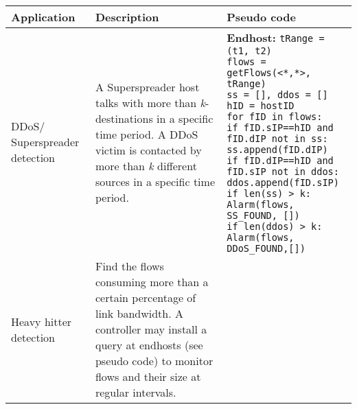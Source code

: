 \newpage
\begin{table}[!h]
{\small
{}
\begin{tabular}{C{2cm} L{5cm} L{10cm}}
\toprule
  \textbf{Application}  &  \textbf{Description}  &  \textbf{Pseudo code} \\
\midrule \midrule

DDoS/\newline
Superspreader
detection				& A Superspreader host talks with more than  \textit{k}-destinations in a 								  specific time period. A DDoS victim is contacted by more 								than \textit{k} different sources in a specific time period. 
						&  \textbf{Endhost:} \newline
							\texttt{tRange = (t1, t2) \newline
							flows = getFlows(<*,*>, tRange) \newline
							ss = [], ddos = [] hID = hostID \newline
							for fID in flows: \newline
							\hspace{0.2cm}	if fID.sIP==hID and fID.dIP not in ss: \newline
							\hspace{0.3cm} \hspace{0.3cm}		ss.append(fID.dIP) \newline
							\hspace{0.2cm}	if fID.dIP==hID and fID.sIP not in ddos: \newline
							 \hspace{0.3cm}\hspace{0.3cm}		ddos.append(fID.sIP) \newline
							if len(ss) > k: \newline
								\hspace{0.3cm} Alarm(flows, SS\_FOUND, []) \newline
							if len(ddos) > k: \newline
								\hspace{0.3cm} Alarm(flows, DDoS\_FOUND,[]) } \\
\midrule

Heavy hitter detection &  Find the flows consuming more than a certain percentage of link bandwidth. A controller may install a query at endhosts (see pseudo code) to monitor flows and their size at regular intervals. 


\end{tabular}}
\end{table}
